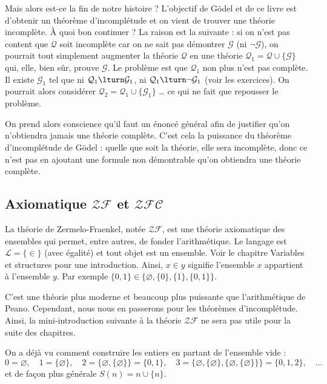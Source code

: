 \documentclass[11pt,class=report,crop=false]{standalone}
\begin{document}
Mais alors est-ce la fin de notre histoire ? L'objectif de Gödel et de ce livre est d'obtenir un théorème d'incomplétude et on vient de trouver une théorie incomplète. 
À quoi bon continuer ? La raison est la suivante : si on n'est pas content que $\mathcal{Q}$ soit incomplète car on ne sait pas démontrer $\mathcal{G}$ (ni $\lnot \mathcal{G}$), on pourrait tout simplement augmenter la théorie $\mathcal{Q}$ en une théorie $\mathcal{Q}_1 = \mathcal{Q} \cup \{\mathcal{G}\}$ qui, elle, bien sûr, prouve $\mathcal{G}$. 
Le problème est que $\mathcal{Q}_1$ non plus n'est pas complète. Il existe $\mathcal{G}_1$ tel que ni $\mathcal{Q}_1 \lturn \mathcal{G}_1$, ni $\mathcal{Q}_1 \lturn \lnot \mathcal{G}_1$ (voir les exercices). On pourrait alors considérer $\mathcal{Q}_2 = \mathcal{Q}_1 \cup \{\mathcal{G}_1\}$ \dots{} ce qui ne fait que repousser le problème.

On prend alors conscience qu'il faut un énoncé général afin de justifier qu'on n'obtiendra jamais une théorie complète. C'est cela la puissance du théorème d'incomplétude de Gödel : quelle que soit la théorie, elle sera incomplète, donc ce n'est pas en ajoutant une formule non démontrable qu'on obtiendra une théorie complète.



\subsection{Axiomatique $\mathcal{ZF}$ et $\mathcal{ZFC}$}



La théorie de Zermelo-Fraenkel, notée $\mathcal{ZF}$, est une théorie axiomatique des ensembles qui permet, entre autres, de fonder l'arithmétique.
Le langage est $\mathcal{L} = \{\in\}$ (avec égalité) et tout objet est un ensemble. Voir le chapitre \og{}Variables et structures\fg{} pour une introduction. Ainsi, \og{}$x \in y$\fg{} signifie \og{}l'ensemble $x$ appartient à l'ensemble $y$\fg{}.
Par exemple $\{0, 1\} \in \big\{ \varnothing, \{0\}, \{1\}, \{0, 1\} \big\}$. 

C'est une théorie plus moderne et beaucoup plus puissante que l'arithmétique de Peano. Cependant, nous nous en passerons pour les théorèmes d'incomplétude. Ainsi, la mini-introduction suivante à la théorie $\mathcal{ZF}$ ne sera pas utile pour la suite des chapitres.

On a déjà vu comment construire les entiers en partant de l'ensemble vide :
\[ 0 = \varnothing, \quad 1 = \{\varnothing\}, \quad 2 = \{\varnothing, \{\varnothing\}\} = \{0, 1\}, \quad 3 = \{\varnothing, \{\varnothing\}, \{\varnothing, \{\varnothing\}\}\} = \{0, 1, 2\}, \quad \dots \]
et de façon plus générale $S(n) = n \cup \{n\}$.
\end{document}

